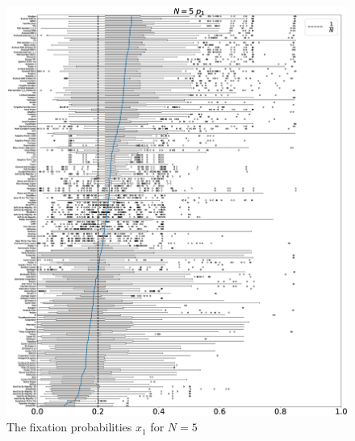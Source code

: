 \documentclass[10pt,letterpaper]{article}
\begin{document}
\begin{figure}[!hbtp]
    \centering
    \includegraphics[draft, width=\textwidth]{./Fig15.eps}
    \caption{The fixation probabilities \(x_1\) for \(N=5\)}
\end{figure}
\end{document}
